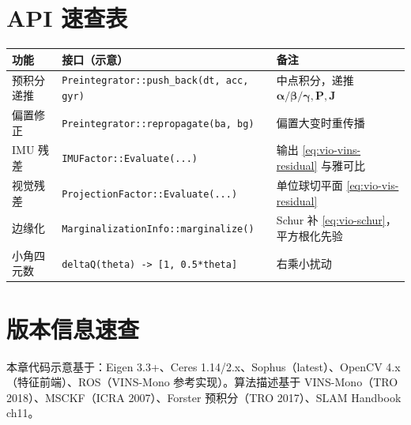 \section*{API 速查表}
\begin{table}[H]\centering\small
\begin{tabular}{lll}
\toprule
功能 & 接口（示意） & 备注 \\
\midrule
预积分递推 & \texttt{Preintegrator::push\_back(dt, acc, gyr)} & 中点积分，递推 $\boldsymbol{\alpha}/\boldsymbol{\beta}/\boldsymbol{\gamma},\mathbf{P},\mathbf{J}$ \\
偏置修正 & \texttt{Preintegrator::repropagate(ba, bg)} & 偏置大变时重传播 \\
IMU 残差 & \texttt{IMUFactor::Evaluate(...)} & 输出 \cref{eq:vio-vins-residual} 与雅可比 \\
视觉残差 & \texttt{ProjectionFactor::Evaluate(...)} & 单位球切平面 \cref{eq:vio-vis-residual} \\
边缘化 & \texttt{MarginalizationInfo::marginalize()} & Schur 补 \cref{eq:vio-schur}，平方根化先验 \\
小角四元数 & \texttt{deltaQ(theta) -> [1, 0.5*theta]} & 右乘小扰动 \\
\bottomrule
\end{tabular}
\end{table}

\section*{版本信息速查}
本章代码示意基于：Eigen 3.3+、Ceres 1.14/2.x、Sophus（latest）、OpenCV 4.x（特征前端）、ROS（VINS-Mono 参考实现）。算法描述基于 VINS-Mono（TRO 2018）、MSCKF（ICRA 2007）、Forster 预积分（TRO 2017）、SLAM Handbook ch11。
